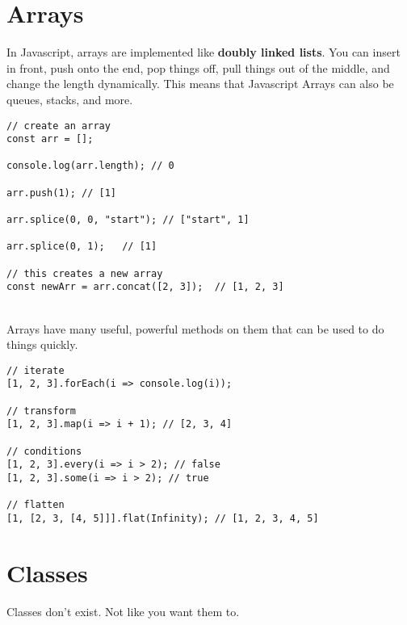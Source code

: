 \documentclass{article}
\begin{document}
\section{Arrays}

In Javascript, arrays are implemented like \textbf{doubly linked lists}. You can insert in front, push onto the end, pop things off, pull things out of the middle, and change the length dynamically. This means that Javascript Arrays can also be queues, stacks, and more.

\begin{lstlisting}
// create an array
const arr = [];

console.log(arr.length); // 0

arr.push(1); // [1]

arr.splice(0, 0, "start"); // ["start", 1]

arr.splice(0, 1);	// [1]

// this creates a new array
const newArr = arr.concat([2, 3]);	// [1, 2, 3]

\end{lstlisting}

\noindent
\\
Arrays have many useful, powerful methods on them that can be used to do things quickly.

\begin{lstlisting}
// iterate
[1, 2, 3].forEach(i => console.log(i));

// transform
[1, 2, 3].map(i => i + 1); // [2, 3, 4]

// conditions
[1, 2, 3].every(i => i > 2); // false
[1, 2, 3].some(i => i > 2); // true

// flatten
[1, [2, 3, [4, 5]]].flat(Infinity); // [1, 2, 3, 4, 5]
\end{lstlisting}

\section{Classes}

Classes don't exist. Not like you want them to.
\end{document}
